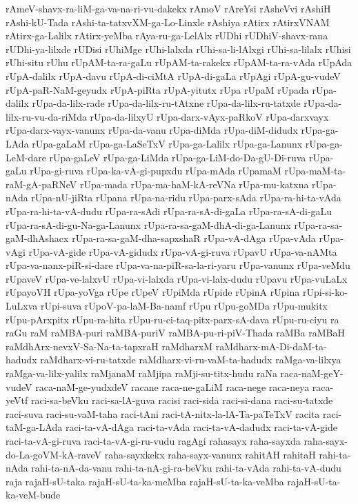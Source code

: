 {rAmeV-shavx-ra-liM-ga-va-na-ri-vu-dakekx
rAmoV
rAreYsi
rAsheVvi
rAshiH
rAshi-kU-Tada
rAshi-ta-tatxvXM-ga-Lo-Linxle
rAshiya
rAtirx
rAtirxVNAM
rAtirx-ga-Lalilx
rAtirx-yeMba
rAya-ru-ga-LelAlx
rUDhi
rUDhiV-shavx-rana
rUDhi-ya-lilxde
rUDisi
rUhiMge
rUhi-lalxda
rUhi-sa-li-lAlxgi
rUhi-sa-lilalx
rUhisi
rUhi-situ
rUhu
rUpAM-ta-ra-gaLu
rUpAM-ta-rakekx
rUpAM-ta-ra-vAda
rUpAda
rUpA-dalilx
rUpA-davu
rUpA-di-ciMtA
rUpA-di-gaLa
rUpAgi
rUpA-gu-vudeV
rUpA-paR-NaM-geyudx
rUpA-piRta
rUpA-yitutx
rUpa
rUpaM
rUpada
rUpa-dalilx
rUpa-da-lilx-rade
rUpa-da-lilx-ru-tAtxne
rUpa-da-lilx-ru-tatxde
rUpa-da-lilx-ru-vu-da-riMda
rUpa-da-lilxyU
rUpa-darx-vAyx-paRkoV
rUpa-darxvayx
rUpa-darx-vayx-vanunx
rUpa-da-vanu
rUpa-diMda
rUpa-diM-didudx
rUpa-ga-LAda
rUpa-gaLaM
rUpa-ga-LaSeTxV
rUpa-ga-Lalilx
rUpa-ga-Lanunx
rUpa-ga-LeM-dare
rUpa-gaLeV
rUpa-ga-LiMda
rUpa-ga-LiM-do-Da-gU-Di-ruva
rUpa-gaLu
rUpa-gi-ruva
rUpa-ka-vA-gi-pupxdu
rUpa-mAda
rUpamaM
rUpa-maM-ta-raM-gA-paRNeV
rUpa-mada
rUpa-ma-haM-kA-reVNa
rUpa-mu-katxna
rUpa-nAda
rUpa-nU-jiRta
rUpana
rUpa-na-ridu
rUpa-parx-sAda
rUpa-ra-hi-ta-vAda
rUpa-ra-hi-ta-vA-dudu
rUpa-ra-sAdi
rUpa-ra-sA-di-gaLa
rUpa-ra-sA-di-gaLu
rUpa-ra-sA-di-gu-Na-ga-Lanunx
rUpa-ra-sa-gaM-dhA-di-ga-Lanunx
rUpa-ra-sa-gaM-dhAshacx
rUpa-ra-sa-gaM-dha-sapxshaR
rUpa-vA-dAga
rUpa-vAda
rUpa-vAgi
rUpa-vA-gide
rUpa-vA-gidudx
rUpa-vA-gi-ruva
rUpavU
rUpa-va-nAMta
rUpa-va-nanx-piR-si-dare
rUpa-va-na-piR-sa-la-ri-yaru
rUpa-vanunx
rUpa-veMdu
rUpaveV
rUpa-ve-lalxvU
rUpa-vi-lalxda
rUpa-vi-lalx-dudu
rUpavu
rUpa-vuLaLx
rUpayoVH
rUpa-yoVga
rUpe
rUpeV
rUpiMda
rUpide
rUpinA
rUpina
rUpi-si-ko-LuLxva
rUpi-suva
rUpoV-pa-laM-Ba-namf
rUpu
rUpu-goMDa
rUpu-mukitx
rUpu-pArxpitx
rUpu-ra-hita
rUpu-ru-ci-taq-pitx-parx-sA-dava
rUpu-ru-ciyu
ra
raGu
raM
raMBA-puri
raMBA-puriV
raMBA-pu-ri-piV-Thada
raMBa
raMBaH
raMdhArx-nevxV-Sa-Na-ta-tapxraH
raMdharxM
raMdharx-mA-Di-daM-ta-hadudx
raMdharx-vi-ru-tatxde
raMdharx-vi-ru-vaM-ta-hadudx
raMga-va-lilxya
raMga-va-lilx-yalilx
raMjanaM
raMjipa
raMji-su-titx-hudu
raNa
raca-naM-geY-vudeV
raca-naM-ge-yudxdeV
racane
raca-ne-gaLiM
raca-nege
raca-neya
raca-yeVtf
raci-sa-beVku
raci-sa-lA-guva
racisi
raci-sida
raci-si-dana
raci-su-tatxde
raci-suva
raci-su-vaM-taha
raci-tAni
raci-tA-nitx-la-lA-Ta-paTeTxV
racita
raci-taM-ga-LAda
raci-ta-vA-dAga
raci-ta-vAda
raci-ta-vA-dadudx
raci-ta-vA-gide
raci-ta-vA-gi-ruva
raci-ta-vA-gi-ru-vudu
ragAgi
rahasayx
raha-sayxda
raha-sayx-do-La-goVM-kA-raveV
raha-sayxkekx
raha-sayx-vanunx
rahitAH
rahitaH
rahi-ta-nAda
rahi-ta-nA-da-vanu
rahi-ta-nA-gi-ra-beVku
rahi-ta-vAda
rahi-ta-vA-dudu
raja
rajaH-sU-taka
rajaH-sU-ta-ka-meMba
rajaH-sU-ta-ka-veMba
rajaH-sU-ta-ka-veM-bude
}
